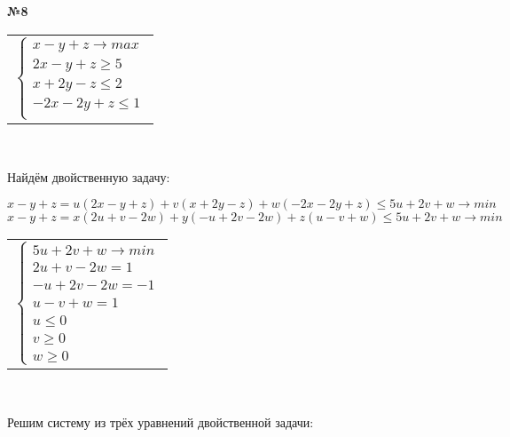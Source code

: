 \documentclass{article}
\newenvironment{task}{\begin{center}\fontsize{14}{14}\selectfont\bf}{\rm\fontsize{12}{12}\selectfont\end{center}}
\begin{document}
	
	\begin{task} 
		№8
	\end{task}
	\begin{center}
		\begin{tabular}{c}
			$\begin{cases}
			x-y+z \rightarrow max \\
			2x-y+z \geq 5 \\
			x+2y-z \leq 2 \\
			-2x-2y+z \leq 1 \\
			\end{cases}$
		\end{tabular}\\
	\end{center}
	Найдём двойственную задачу:
	\begin{center}
		$x-y+z = u(2x-y+z) + v(x+2y-z) + w(-2x-2y+z) \leq 5u+2v+w \rightarrow min$ \\
		$x-y+z = x(2u+v-2w) + y(-u+2v-2w) + z(u-v+w) \leq 5u+2v+w \rightarrow min$ \\
		\begin{tabular}{c}
			$\begin{cases}
			5u+2v+w \rightarrow min \\
			2u+v-2w = 1 \\
			-u+2v-2w = -1 \\
			u-v+w = 1 \\
			u \leq 0 \\
			v \geq 0 \\ 
			w \geq 0
			\end{cases}$
		\end{tabular}\\
	\end{center}
	Решим систему из трёх уравнений двойственной задачи:\\
	\fontsize{6}{6}
\end{document}
